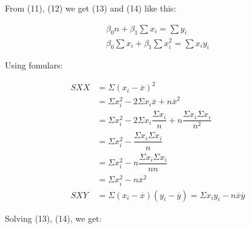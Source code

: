 \documentclass{article}
\begin{document}
    From (11), (12) we get (13) and (14) like this: 
    
    \begin{align} 
        \beta_{0} n + \beta_{1} \displaystyle \sum x_{i} = \displaystyle \sum y_{i}
        \\
        \beta_{0} \displaystyle \sum x_{i} + \beta_{1} \displaystyle \sum x_{i}^2 = \displaystyle \sum x_{i} y_{i}
    \end{align}
    
    Using fomulars: 
    
     \begin{align} 
        SXX &= \Sigma (x_{i} - \overline{x})^2 \\
        &= \Sigma x_{i}^2 - 2 \Sigma x_{i} \overline{x} + n\overline{x}^2  \nonumber \\
        &= \Sigma x_{i}^2 - 2 \Sigma x_{i} \dfrac{\Sigma x_{i}}{n} + n\dfrac{\Sigma x_{i} \Sigma x_{i}}{n^2}   \nonumber \\
        &= \Sigma x_{i}^2 - \dfrac{\Sigma x_{i} \Sigma x_{i}}{n} \nonumber \\
        &= \Sigma x_{i}^2 - n\dfrac{\Sigma x_{i} \Sigma x_{i}}{n n} \nonumber \\
        &= \Sigma x_{i}^2 - n\overline{x}^2 \nonumber \\
        SXY &= \Sigma (x_{i} - \overline{x})(y_{i} - \overline{y}) = \Sigma x_{i}y_{i} - n\overline{x}\overline{y}
    \end{align}
    
    Solving (13), (14), we get:
    
\end{document}
